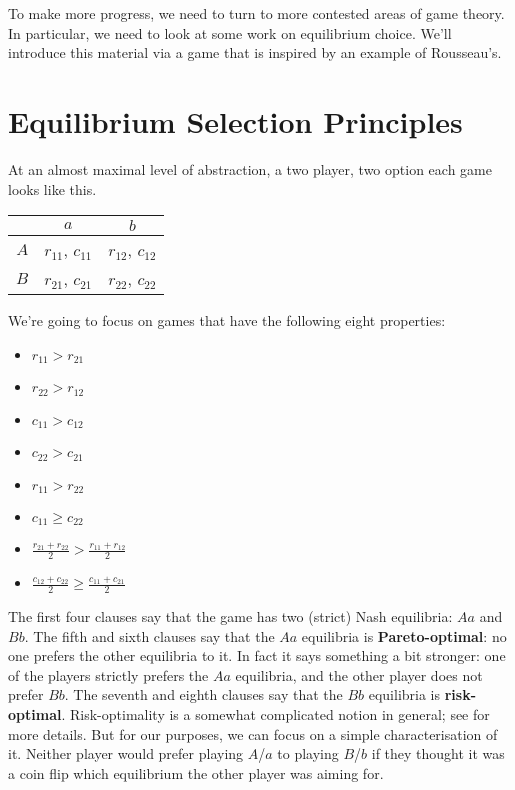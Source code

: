 \documentclass{article}
\begin{document}
To make more progress, we need to turn to more contested areas of game theory. In particular, we need to look at some work on equilibrium choice. We'll introduce this material via a game that is inspired by an example of Rousseau's.

\section{Equilibrium Selection Principles}
\label{equilibriumselectionprinciples}

At an almost maximal level of abstraction, a two player, two option each game looks like this.

\begin{center}
\begin{tabular}{r | c c}
& $a$ & $b$ \\\hline
$A$ & $r_{11}$, $c_{11}$ & $r_{12}$, $c_{12}$ \\
$B$ & $r_{21}$, $c_{21}$ & $r_{22}$, $c_{22}$
\end{tabular}
\end{center}
We're going to focus on games that have the following eight properties:

\begin{itemize}
\item $r_{11} > r_{21}$
\item $r_{22} > r_{12}$
\item $c_{11} > c_{12}$
\item $c_{22} > c_{21}$
\item $r_{11} > r_{22}$
\item $c_{11} \geq c_{22}$
\item $\frac{r_{21}+r_{22}}{2} > \frac{r_{11}+r_{12}}{2}$
\item $\frac{c_{12}+c_{22}}{2} \geq \frac{c_{11}+c_{21}}{2}$
\end{itemize}
The first four clauses say that the game has two (strict) Nash equilibria: $Aa$ and $Bb$. The fifth and sixth clauses say that the $Aa$ equilibria is \textbf{Pareto-optimal}: no one prefers the other equilibria to it. In fact it says something a bit stronger: one of the players strictly prefers the $Aa$ equilibria, and the other player does not prefer $Bb$. The seventh and eighth clauses say that the $Bb$ equilibria is \textbf{risk-optimal}. Risk-optimality is a somewhat complicated notion in general; see \citet{HarsanyiSelten1988} for more details. But for our purposes, we can focus on a simple characterisation of it. Neither player would prefer playing $A$\slash $a$ to playing $B$\slash $b$ if they thought it was a coin flip which equilibrium the other player was aiming for.
\end{document}
